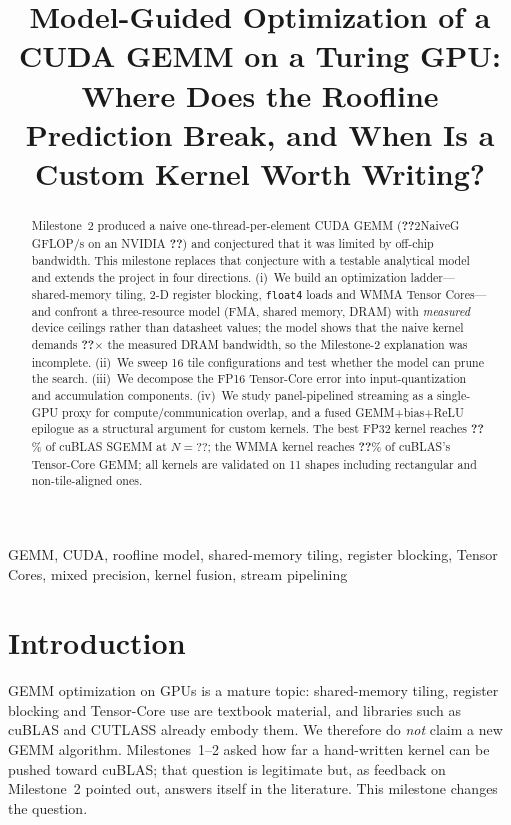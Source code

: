 \documentclass[conference]{IEEEtran}
\providecommand{\devName}{\textbf{??}}
\providecommand{\impliedRatio}{\textbf{??}}
\providecommand{\m}{\textbf{??}}
\providecommand{\m}{\textbf{??}}
\providecommand{\m}{\textbf{??}}
\providecommand{\m}{\textbf{??}}
\providecommand{\m}{\textbf{??}}
\providecommand{\m}{\textbf{??}}
\providecommand{\m}{\textbf{??}}
\providecommand{\nRef}{\textbf{??}}
\providecommand{\regVecPctCublas}{\textbf{??}}
\providecommand{\wmmaPctTC}{\textbf{??}}
\begin{document}
\title{Model-Guided Optimization of a CUDA GEMM on a Turing GPU: Where Does the Roofline Prediction Break, and When Is a Custom Kernel Worth Writing?}

\author{
\and
{}
\and
{}
\and
{}}

\maketitle

\begin{abstract}
Milestone~2 produced a naive one-thread-per-element CUDA GEMM (\m2NaiveG{} GFLOP/s on an NVIDIA \devName) and conjectured that it was limited by off-chip bandwidth. This milestone replaces that conjecture with a testable analytical model and extends the project in four directions. (i)~We build an optimization ladder---shared-memory tiling, 2-D register blocking, \texttt{float4} loads and WMMA Tensor Cores---and confront a three-resource model (FMA, shared memory, DRAM) with \emph{measured} device ceilings rather than datasheet values; the model shows that the naive kernel demands \impliedRatio$\times$ the measured DRAM bandwidth, so the Milestone-2 explanation was incomplete. (ii)~We sweep 16 tile configurations and test whether the model can prune the search. (iii)~We decompose the FP16 Tensor-Core error into input-quantization and accumulation components. (iv)~We study panel-pipelined streaming as a single-GPU proxy for compute/communication overlap, and a fused GEMM+bias+ReLU epilogue as a structural argument for custom kernels. The best FP32 kernel reaches \regVecPctCublas\% of cuBLAS SGEMM at $N{=}\nRef$; the WMMA kernel reaches \wmmaPctTC\% of cuBLAS's Tensor-Core GEMM; all kernels are validated on 11 shapes including rectangular and non-tile-aligned ones.
\end{abstract}

\begin{IEEEkeywords}
GEMM, CUDA, roofline model, shared-memory tiling, register blocking, Tensor Cores, mixed precision, kernel fusion, stream pipelining
\end{IEEEkeywords}

\section{Introduction}
GEMM optimization on GPUs is a mature topic: shared-memory tiling, register blocking and Tensor-Core use are textbook material, and libraries such as cuBLAS and CUTLASS already embody them. We therefore do \emph{not} claim a new GEMM algorithm. Milestones~1--2 asked how far a hand-written kernel can be pushed toward cuBLAS; that question is legitimate but, as feedback on Milestone~2 pointed out, answers itself in the literature. This milestone changes the question.
\end{document}
